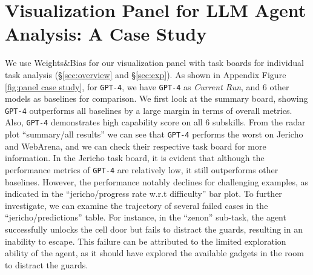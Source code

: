 \section{Visualization Panel for LLM Agent Analysis: A Case Study}
\label{sec: wandb panel}

We use Weights\&Bias for our visualization panel with   task boards for individual task analysis (\S \ref{sec:overview} and \S \ref{sec:exp}). As shown in Appendix Figure \ref{fig:panel case study}, for \texttt{GPT-4}, we have \texttt{GPT-4} as \emph{Current Run}, and 6 other models as baselines for comparison. We first look at the summary board, showing \texttt{GPT-4} outperforms all baselines by a large margin in terms of overall metrics. Also, \texttt{GPT-4} demonstrates high capability score on all 6 subskills. From the radar plot ``summary/all results'' we can see that \texttt{GPT-4}
performs the worst on Jericho and WebArena, and we can check their respective task board for more information. 
In the Jericho task board, it is evident that although the performance metrics of \texttt{GPT-4} are relatively low, it still outperforms other baselines. However, the performance notably declines for challenging examples, as indicated in the ``jericho/progress rate w.r.t difficulty'' bar plot. To further investigate, we can examine the trajectory of several failed cases in the ``jericho/predictions'' table. For instance, in the ``zenon'' sub-task, the agent successfully unlocks the cell door but fails to distract the guards, resulting in an inability to escape. This failure can be attributed to the limited exploration ability of the agent, as it should have explored the available gadgets in the room to distract the guards.



